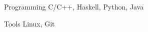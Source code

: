 


\begin{cvskills}


\cvskill
{Programming} %
{C/C++, Haskell, Python, Java} %


\cvskill
{Tools} %
{Linux, Git} %


\end{cvskills}
